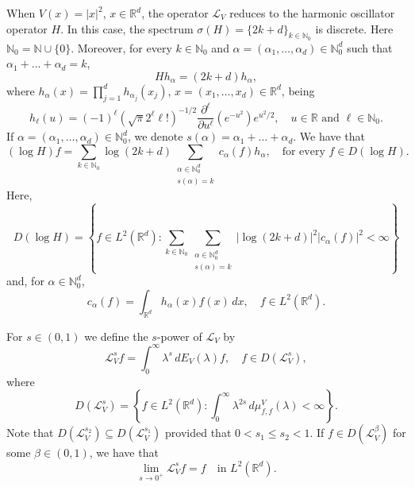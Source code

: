 \documentclass[10pt, a4paper, reqno]{amsart}
\theoremstyle{definition}
\theoremstyle{remark}
\numberwithin{equation}{section}
\begin{document}
When $V(x) = |x|^2$, $x\in\mathbb{R}^d$, the operator $\mathcal{L}_V$ reduces to the harmonic oscillator operator $H$. In this case, the spectrum $\sigma(H) = \{2k+d\}_{k\in \mathbb{N}_0}$ is discrete. Here $\mathbb{N}_0 = \mathbb{N} \cup \{0\}$. Moreover, for every $k\in \mathbb{N}_0$ and $\alpha = (\alpha_1,\dots,\alpha_d)\in \mathbb{N}_0^d$ such that $\alpha_1+\dots+\alpha_d = k$, 
\begin{equation*}
    H h_\alpha = (2k+d) h_\alpha,
\end{equation*}
where $\displaystyle h_\alpha(x) = \prod_{j=1}^d h_{\alpha_j}(x_j)$, $x=(x_1,\dots,x_d)\in\mathbb{R}^d$, being
\begin{equation*}
    h_\ell (u) = (-1)^\ell (\sqrt{\pi} 2^\ell \ell !)^{-1/2} \frac{ \partial^\ell}{\partial u^\ell} \left(e^{-u^2}\right) e^{u^2/2}, \quad u\in\mathbb{R} \text{ and } \ell\in\mathbb{N}_0.
\end{equation*}
If $\alpha = (\alpha_1,\dots,\alpha_d)\in \mathbb{N}_0^d$, we denote $s(\alpha) = \alpha_1 +\dots + \alpha_d$. We have that
\begin{equation*}
    (\log H) f = \sum_{k\in\mathbb{N}_0} \log(2k+d) \sum_{\substack{\alpha\in \mathbb{N}_0^d \\ s(\alpha)=k}} c_\alpha(f) h_\alpha, \quad \text{for every } f \in D(\log H).
\end{equation*}
Here, 
\begin{equation*}
    D(\log H) =  \left\{ f \in L^2(\mathbb{R}^d): 
    \sum_{k\in\mathbb{N}_0} \sum_{\substack{\alpha\in \mathbb{N}_0^d \\ s(\alpha)=k}} 
    |\log(2k+d)|^2 |c_\alpha(f)|^2 < \infty
    \right\}
\end{equation*}
and, for $\alpha \in \mathbb{N}_0^d$,
\begin{equation*}
    c_\alpha(f) = \int_{\mathbb{R}^d} h_\alpha(x) f(x) \, dx, \quad f \in L^2(\mathbb{R}^d).
\end{equation*}

For $s \in (0,1)$ we define the $s$-power of $\mathcal{L}_V$ by
\begin{equation*}
    \mathcal{L}_V^s f = \int_0^\infty \lambda^s \, dE_V(\lambda) f, \quad f \in D(\mathcal{L}_V^s),
\end{equation*}
where
\begin{equation*}
    D(\mathcal{L}_V^s) = \left\{
    f \in L^2(\mathbb{R}^d) : \int_0^\infty \lambda^{2s} \, d\mu_{f,f}^V(\lambda) < \infty
    \right\}.    
\end{equation*}
Note that $D(\mathcal{L}_V^{s_2}) \subseteq D(\mathcal{L}_V^{s_1})$ 
provided that $0 < s_1 \leq s_2 < 1$. If $f \in D(\mathcal{L}_V^\beta)$ for some $\beta \in (0,1)$, we have that
\begin{equation*}
    \lim_{s \rightarrow 0^+} \mathcal{L}_V^s f = f \quad \text{in } L^2(\mathbb{R}^d). 
\end{equation*}
\end{document}
